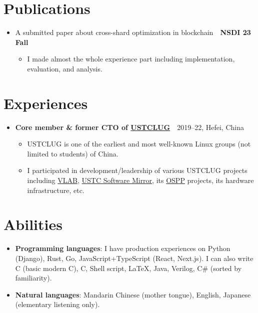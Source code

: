 \documentclass{article}
\newcommand{\Cpp}{C\nolinebreak[4]\hspace{-.05em}\raisebox{.4ex}{\tiny\bf ++}}
\newcommand{\Csharp}{C{\fontfaceLiberationSerif\#}}
\begin{document}
\section*{Publications}
\begin{itemize}[parsep=0.1cm,leftmargin=0.4cm]
  \item A submitted paper about cross-shard optimization in blockchain\ \dotfill\ \textbf{NSDI {\textquotesingle}23 Fall}
  \begin{itemize}[itemsep=0cm,parsep=0cm,topsep=0cm,leftmargin=0.25cm,label=]
    \item I made almost the whole experience part including implementation, evaluation, and analysis.
  \end{itemize}
\end{itemize}

\section*{Experiences}
\begin{itemize}[parsep=0.1cm,leftmargin=0.4cm]
  \item \textbf{Core member \& former CTO of \href{https://lug.ustc.edu.cn/}{USTCLUG}}\ \dotfill\ 2019--22, Hefei, China
    \begin{itemize}[itemsep=0cm,parsep=0cm,topsep=0cm,leftmargin=0.25cm,label=]
      \item USTCLUG is one of the earliest and most well-known Linux groups (not limited to students) of China.
      \item I participated in development/leadership of various USTCLUG projects including \href{https://vlab.ustc.edu.cn/}{VLAB}, \href{https://mirrors.ustc.edu.cn/}{USTC Software Mirror}, its \href{https://summer-ospp.ac.cn/}{OSPP} projects, its hardware infrastructure, etc.
    \end{itemize}
\end{itemize}

\section*{Abilities}
\begin{itemize}[parsep=0.1cm,leftmargin=0.4cm]
  \item \textbf{Programming languages}:
    I have production experiences on Python (Django), Rust, Go, JavaScript+TypeScript (React, Next.js).
    I can also write \Cpp{} (basic modern \Cpp), C, Shell script, \LaTeX, Java, Verilog, \Csharp{} (sorted by familiarity).
  \item \textbf{Natural languages}: Mandarin Chinese (mother tongue), English, Japanese (elementary listening only).
\end{itemize}

\blindtext[2]{}
\end{document}
